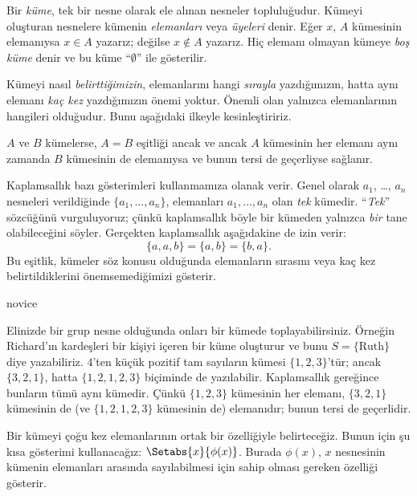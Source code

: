 \documentclass[../../../include/open-logic-section]{subfiles}
\begin{document}

Bir \emph{küme}, tek bir nesne olarak ele alınan nesneler topluluğudur.
Kümeyi oluşturan nesnelere kümenin \emph{elemanları} veya \emph{üyeleri}
denir. Eğer $x$, $A$ kümesinin elemanıysa $x \in A$ yazarız; değilse
$x \notin A$ yazarız. Hiç elemanı olmayan kümeye \emph{boş küme} denir ve
bu küme ``$\emptyset$'' ile gösterilir.

\begin{explain}
Kümeyi nasıl \emph{belirttiğimizin}, elemanlarını hangi \emph{sırayla}
yazdığımızın, hatta aynı elemanı \emph{kaç kez} yazdığımızın önemi yoktur.
Önemli olan yalnızca elemanlarının hangileri olduğudur. Bunu aşağıdaki ilkeyle
kesinleştiririz.
\end{explain}

\begin{defn}[Kaplamsallık]
  $A$ ve $B$ kümelerse, $A = B$ eşitliği ancak ve ancak $A$ kümesinin her
  elemanı aynı zamanda $B$ kümesinin de elemanıysa ve bunun tersi de
  geçerliyse sağlanır.
\end{defn}

Kaplamsallık bazı gösterimleri kullanmamıza olanak verir. Genel olarak
$a_{1}$, \dots, $a_{n}$ nesneleri verildiğinde $\{a_{1}, \dots, a_{n}\}$,
elemanları $a_1, \ldots, a_n$ olan \emph{tek} kümedir. ``\emph{Tek}''
sözcüğünü vurguluyoruz; çünkü kaplamsallık böyle bir kümeden yalnızca
\emph{bir} tane olabileceğini söyler. Gerçekten kaplamsallık aşağıdakine de
izin verir:
  \[
    \{a, a, b\} = \{a, b\} = \{b,a\}.
  \]
Bu eşitlik, kümeler söz konusu olduğunda elemanların sırasını veya kaç kez
belirtildiklerini önemsemediğimizi gösterir.

\begin{tagblock}{novice}
\begin{ex}
Elinizde bir grup nesne olduğunda onları bir kümede toplayabilirsiniz.
Örneğin Richard'ın kardeşleri bir kişiyi içeren bir küme oluşturur ve bunu
$S=\{\textrm{Ruth}\}$ diye yazabiliriz. $4$'ten küçük pozitif tam sayıların
kümesi $\{1, 2, 3\}$'tür; ancak $\{3, 2, 1\}$, hatta $\{1, 2, 1, 2, 3\}$
biçiminde de yazılabilir. Kaplamsallık gereğince bunların tümü aynı kümedir.
Çünkü $\{1, 2, 3\}$ kümesinin her elemanı, $\{3, 2, 1\}$ kümesinin de
(ve $\{1, 2, 1, 2, 3\}$ kümesinin de) elemanıdır; bunun tersi de geçerlidir.
\end{ex}
\end{tagblock}

Bir kümeyi çoğu kez elemanlarının ortak bir özelliğiyle
belirteceğiz. Bunun için şu kısa gösterimi kullanacağız:
$\Setabs{x}{\phi(x)}$. Burada $\phi(x)$, $x$ nesnesinin kümenin elemanları
arasında sayılabilmesi için sahip olması gereken özelliği gösterir.
\end{document}
